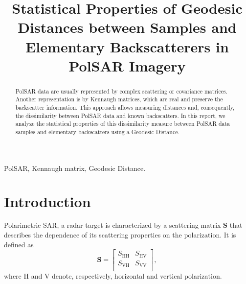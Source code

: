 \documentclass[conference]{IEEEtran}
\begin{document}
\title{Statistical Properties of Geodesic Distances between Samples and Elementary Backscatterers in PolSAR Imagery}

\author{
}

\maketitle

\begin{abstract}
PolSAR data are usually represented by complex scattering or covariance matrices.
Another representation is by Kennaugh matrices, which are real and preserve the backscatter information.
This approach allows measuring distances and, consequently, the dissimilarity between PolSAR data and known backscatters.
In this report, we analyze the statistical properties of this dissimilarity measure between PolSAR data samples and elementary backscatters using a Geodesic Distance.
\end{abstract}

\begin{IEEEkeywords}
PolSAR, Kennaugh matrix, Geodesic Distance.
\end{IEEEkeywords}

\section{Introduction}
 Polarimetric SAR, a radar target is characterized by a scattering matrix $\bm S$ that describes the dependence of its scattering properties on the polarization. 
It is defined as
\[\bm{S} = 
\begin{bmatrix}
S_{\text{HH}} & S_{\text{HV}}\\
S_{\text{VH}} & S_{\text{VV}}\\
\end{bmatrix}
,\]
where $\text{H}$ and $\text{V}$ denote, respectively, horizontal and vertical polarization.
\end{document}
